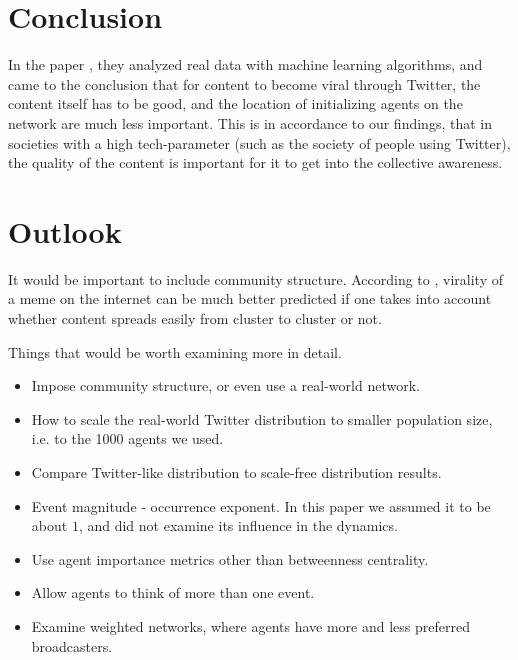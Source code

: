 \documentclass [12pt,a4paper,twoside]{article}
\begin{document}
\section{Conclusion}
In the paper \cite{Similar-results}, they analyzed real data with machine learning algorithms, and came to the conclusion that for content to become viral through Twitter, the content itself has to be good, and the location of initializing agents on the network are much less important. This is in accordance to our findings, that in societies with a high tech-parameter (such as the society of people using Twitter), the quality of the content is important for it to get into the collective awareness.

\section{Outlook}

It would be important to include community structure. According to \cite{Virality-community-important}, virality of a meme on the internet can be much better predicted if one takes into account whether content spreads easily from cluster to cluster or not.

Things that would be worth examining more in detail.
\begin{itemize}
\item Impose community structure, or even use a real-world network.
\item How to scale the real-world Twitter distribution to smaller population size, i.e. to the 1000 agents we used.
\item Compare Twitter-like distribution to scale-free distribution results.
\item Event magnitude - occurrence exponent. In this paper we assumed it to be about $1$, and did not examine its influence in the dynamics.
\item Use agent importance metrics other than betweenness centrality.
\item Allow agents to think of more than one event.
\item Examine weighted networks, where agents have more and less preferred broadcasters.
\end{itemize}

\small \setlength{\bibsep}{1pt}

%

\end{document}
